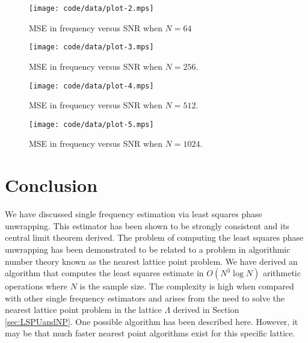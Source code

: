 \documentclass[journal]{IEEEtran}
\begin{document}
\begin{figure}[htbp]
	\centering
		\texttt{[image: code/data/plot-2.mps]}
		\caption{MSE in frequency versus SNR when $N=64$}
		\label{plot:MSEvSNRn=64}
\end{figure}

\begin{figure}[htbp]
	\centering
		\texttt{[image: code/data/plot-3.mps]}
		\caption{MSE in frequency versus SNR when $N=256$.}
		\label{plot:MSEvSNRn=256}
\end{figure}

\begin{figure}[htbp]
	\centering
		\texttt{[image: code/data/plot-4.mps]}
		\caption{MSE in frequency versus SNR when $N=512$.}
		\label{plot:MSEvSNRn=512}
\end{figure}

\begin{figure}[htbp]
	\centering
		\texttt{[image: code/data/plot-5.mps]}
		\caption{MSE in frequency versus SNR when $N=1024$.}
		\label{plot:MSEvSNRn=1024}
\end{figure}



\section{Conclusion}\label{sec:conclusion}

We have discussed single frequency estimation via least squares phase
unwrapping. This estimator has been shown to be strongly consistent and its
central limit theorem derived. The problem of computing the least squares
phase unwrapping has been demonstrated to be related to a problem in
algorithmic number theory known as the nearest lattice point problem. We have
derived an algorithm that computes the least squares estimate in
$O(N^3\log{N})$ arithmetic operations where $N$ is the sample size.  The
complexity is high when compared with other single frequency estimators and
arises from the need to solve the nearest lattice point problem in the lattice
$\Lambda$ derived in Section \ref{sec:LSPUandNP}.  One possible algorithm has
been described here.  However, it may be that much faster nearest point
algorithms exist for this specific lattice.
\end{document}
